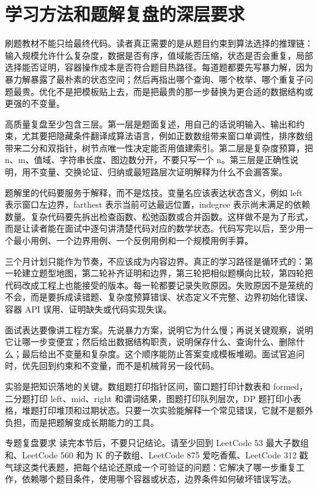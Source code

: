\section{学习方法和题解复盘的深层要求}

刷题教材不能只给最终代码。读者真正需要的是从题目约束到算法选择的推理链：输入规模允许什么复杂度，数据是否有序，值域能否压缩，状态是否会重复，局部选择能否证明，容器操作成本是否符合题目热路径。每道题都要先写暴力解，因为暴力解暴露了最朴素的状态空间；然后再指出哪个查询、哪个枚举、哪个重复子问题最贵。优化不是把模板贴上去，而是把最贵的那一步替换为更合适的数据结构或更强的不变量。

高质量复盘至少包含三层。第一层是题面复述，用自己的话说明输入、输出和约束，尤其要把隐藏条件翻译成算法语言，例如正数数组带来窗口单调性，排序数组带来二分和双指针，树节点唯一性决定能否用值建索引。第二层是复杂度预算，把 n、m、值域、字符串长度、图边数分开，不要只写一个 n。第三层是正确性说明，用不变量、交换论证、归纳或最短路层次证明解释为什么不会漏答案。

题解里的代码要服务于解释，而不是炫技。变量名应该表达状态含义，例如 left 表示窗口左边界，farthest 表示当前可达最远位置，indegree 表示尚未满足的依赖数量。复杂代码要先拆出检查函数、松弛函数或合并函数。这样做不是为了形式，而是让读者能在面试中逐句讲清楚代码对应的数学状态。代码写完以后，至少用一个最小用例、一个边界用例、一个反例用例和一个规模用例手算。

三个月计划只能作为节奏，不应该成为内容边界。真正的学习路径是循环式的：第一轮建立题型地图，第二轮补齐证明和边界，第三轮把相似题横向比较，第四轮把代码改成工程上也能接受的版本。每一轮都要记录失败原因。失败原因不是笼统的不会，而是要拆成读错题、复杂度预算错误、状态定义不完整、边界初始化错误、容器 API 误用、证明缺失或代码实现失误。

面试表达要像讲工程方案。先说暴力方案，说明它为什么慢；再说关键观察，说明它让哪一步变便宜；然后给出数据结构职责，说明保存什么、查询什么、删除什么；最后给出不变量和复杂度。这个顺序能防止答案变成模板堆砌。面试官追问时，优先回到约束和不变量，而不是机械背另一段代码。

实验是把知识落地的关键。数组题打印指针区间，窗口题打印计数表和 formed，二分题打印 left、mid、right 和谓词结果，图题打印队列层次，DP 题打印小表格，堆题打印堆顶和过期状态。只要一次实验能解释一个常见错误，它就不是额外负担，而是把题解变成长期能力的工具。

\begin{principlebox}{专题复盘要求}
读完本节后，不要只记结论。请至少回到 LeetCode 53 最大子数组和、LeetCode 560 和为 K 的子数组、LeetCode 875 爱吃香蕉、LeetCode 312 戳气球这类代表题，把每个结论还原成一个可验证的问题：它解决了哪一步重复工作，依赖哪个题目条件，使用哪个容器或状态，边界条件如何破坏错误写法。
\end{principlebox}
